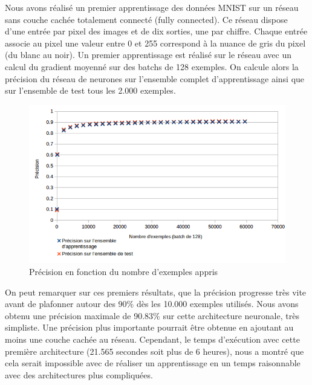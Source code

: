 Nous avons réalisé un premier apprentissage des données MNIST sur un réseau sans couche cachée totalement connecté (fully connected). Ce réseau dispose d'une entrée par pixel des images et de dix sorties, une par chiffre. Chaque entrée associe au pixel une valeur entre 0 et 255 correspond à la nuance de gris du pixel (du blanc au noir). Un premier apprentissage est réalisé sur le réseau avec un calcul du gradient moyenné sur des batchs de 128 exemples. On calcule alors la précision du réseau de neurones sur l'ensemble complet d'apprentissage ainsi que sur l'ensemble de test tous les 2.000 exemples.

\begin{figure}[!h]
\begin{center}
\includegraphics[scale=0.5]{images/mnist_apprentissage_128.png}
\caption{Précision en fonction du nombre d'exemples appris}
\label{mnist_apprentissage_128}
\end{center}
\end{figure}

On peut remarquer sur ces premiers résultats, que la précision progresse très vite avant de plafonner autour des 90\% dès les 10.000 exemples utilisés. Nous avons obtenu une précision maximale de 90.83\% sur cette architecture neuronale, très simpliste. Une précision plus importante pourrait être obtenue en ajoutant au moins une couche cachée au réseau. Cependant, le temps d'exécution avec cette première architecture (21.565 secondes soit plus de 6 heures), nous a montré que cela serait impossible avec de réaliser un apprentissage en un temps raisonnable avec des architectures plus compliquées.
\label{resultat_premiere_implementation}


